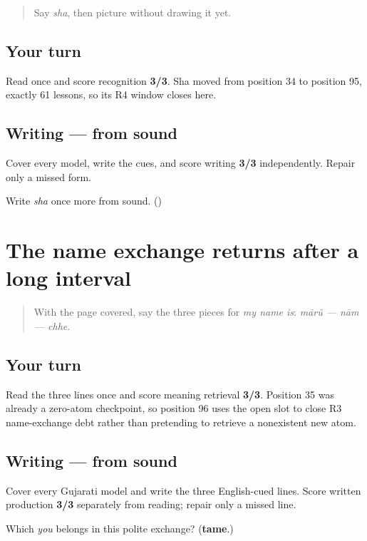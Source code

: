 \begin{quote}
Say \emph{sha}, then picture \textbf{} without drawing it yet.
\end{quote}

\subsection*{Your turn}
Read \textbf{  } once and score recognition \textbf{3/3}. Sha moved from position 34 to position 95, exactly 61 lessons, so its R4 window closes here.

\subsection*{Writing — from sound}
Cover every model, write the cues, and score writing \textbf{3/3} independently. Repair only a missed form.

\begin{tcolorbox}[breakable,colback=teal!4,colframe=teal!35!black,title={Before you move on}]
Write \emph{sha} once more from sound. (\textbf{})
\end{tcolorbox}
\section[Practice]{The name exchange returns after a long interval}

\label{lesson:GU-R15-name-exchange-r3}



\begin{quote}
With the page covered, say the three pieces for \emph{my name is}: \emph{mārũ — nām — chhe}.
\end{quote}

\subsection*{Your turn}
Read the three lines once and score meaning retrieval \textbf{3/3}. Position 35 was already a zero-atom checkpoint, so position 96 uses the open slot to close R3 name-exchange debt rather than pretending to retrieve a nonexistent new atom.

\subsection*{Writing — from sound}
Cover every Gujarati model and write the three English-cued lines. Score written production \textbf{3/3} separately from reading; repair only a missed line.

\begin{tcolorbox}[breakable,colback=teal!4,colframe=teal!35!black,title={Before you move on}]
Which \emph{you} belongs in this polite exchange? (\textbf{tame}.)
\end{tcolorbox}
